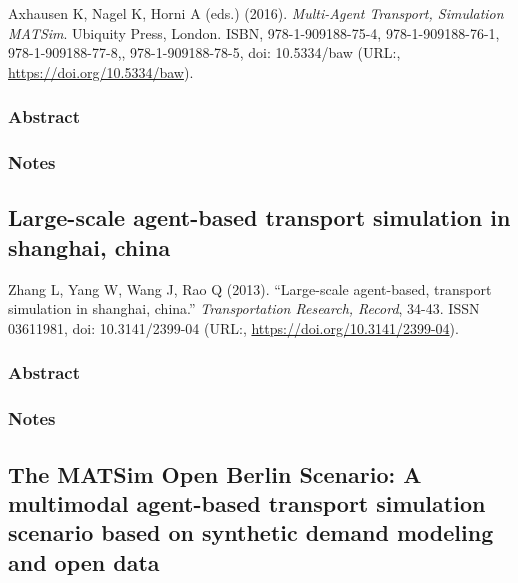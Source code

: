 \documentclass[]{article}
\begin{document}
Axhausen K, Nagel K, Horni A (eds.) (2016). \emph{Multi-Agent Transport,
Simulation MATSim}. Ubiquity Press, London. ISBN, 978-1-909188-75-4,
978-1-909188-76-1, 978-1-909188-77-8,, 978-1-909188-78-5, doi:
10.5334/baw (URL:, \url{https://doi.org/10.5334/baw}).

\hypertarget{abstract-23}{%
\subsubsection{Abstract}\label{abstract-23}}

\hypertarget{notes-23}{%
\subsubsection{Notes}\label{notes-23}}

\hypertarget{large-scale-agent-based-transport-simulation-in-shanghai-china}{%
\subsection{Large-scale agent-based transport simulation in shanghai,
china}\label{large-scale-agent-based-transport-simulation-in-shanghai-china}}

Zhang L, Yang W, Wang J, Rao Q (2013). ``Large-scale agent-based,
transport simulation in shanghai, china.'' \emph{Transportation
Research, Record}, 34-43. ISSN 03611981, doi: 10.3141/2399-04 (URL:,
\url{https://doi.org/10.3141/2399-04}).

\hypertarget{abstract-24}{%
\subsubsection{Abstract}\label{abstract-24}}

\hypertarget{notes-24}{%
\subsubsection{Notes}\label{notes-24}}

\hypertarget{the-matsim-open-berlin-scenario-a-multimodal-agent-based-transport-simulation-scenario-based-on-synthetic-demand-modeling-and-open-data}{%
\subsection{The MATSim Open Berlin Scenario: A multimodal agent-based
transport simulation scenario based on synthetic demand modeling and
open
data}\label{the-matsim-open-berlin-scenario-a-multimodal-agent-based-transport-simulation-scenario-based-on-synthetic-demand-modeling-and-open-data}}
\end{document}
